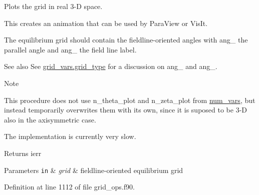 Plots the grid in real 3-\/D space. 

This creates an animation that can be used by Para\+View or Vis\+It.

The equilibrium grid should contain the fieldline-\/oriented angles with {\ttfamily ang\+\_} the parallel angle and {\ttfamily ang\+\_} the field line label.

\begin{DoxySeeAlso}{See also}
See \hyperlink{structgrid__vars_1_1grid__type}{grid\+\_\+vars.\+grid\+\_\+type} for a discussion on {\ttfamily ang\+\_} and {\ttfamily ang\+\_}.
\end{DoxySeeAlso}
\begin{DoxyNote}{Note}

\begin{DoxyEnumerate}
\item This procedure does not use {\ttfamily n\+\_\+theta\+\_\+plot} and {\ttfamily n\+\_\+zeta\+\_\+plot} from \hyperlink{namespacenum__vars}{num\+\_\+vars}, but instead temporarily overwrites them with its own, since it is suposed to be 3-\/D also in the axisymmetric case.
\item The implementation is currently very slow.
\end{DoxyEnumerate}
\end{DoxyNote}
\begin{DoxyReturn}{Returns}
ierr
\end{DoxyReturn}

\begin{DoxyParams}[1]{Parameters}
\mbox{\tt in}  & {\em grid} & fieldline-\/oriented equilibrium grid \\
\hline
\end{DoxyParams}


Definition at line 1112 of file grid\+\_\+ops.\+f90.

